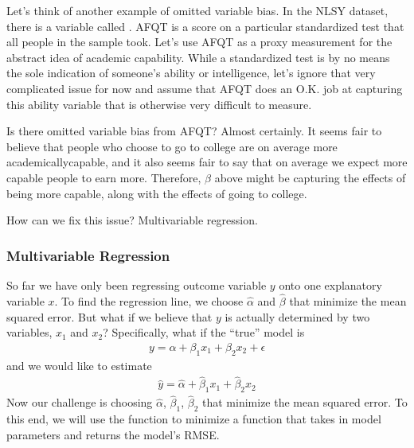 \documentclass[letterpaper,10pt,english]{jupyterBook}
\begin{document}
\sphinxAtStartPar
Let’s think of another example of omitted variable bias. In the NLSY dataset, there is a variable called . AFQT is a score on a particular standardized test that all people in the sample took. Let’s use AFQT as a proxy measurement for the abstract idea of academic capability. While a standardized test is by no means the sole indication of someone’s ability or intelligence, let’s ignore that very complicated issue for now and assume that AFQT does an O.K. job at capturing this ability variable that is otherwise very difficult to measure.

\sphinxAtStartPar
Is there omitted variable bias from AFQT? Almost certainly. It seems fair to believe that people who choose to go to college are on average more academically\sphinxhyphen{}capable, and it also seems fair to say that on average we expect more capable people to earn more. Therefore, \(\hat{\beta}\) above might be capturing the effects of being more capable, along with the effects of going to college.

\sphinxAtStartPar
How can we fix this issue? Multivariable regression.


\subsubsection{Multivariable Regression}
\label{\detokenize{content/11-econometrics/multivariable:multivariable-regression}}
\sphinxAtStartPar
So far we have only been regressing outcome variable \(y\) onto one explanatory variable \(x\). To find the regression line, we choose \(\hat{\alpha}\) and \(\hat{\beta}\) that minimize the mean squared error. But what if we believe that \(y\) is actually determined by two variables, \(x_1\) and \(x_2\)? Specifically, what if the “true” model is
\begin{equation*}
\begin{split}
y = \alpha + \beta_1 x_{1} + \beta_2 x_{2} + \epsilon
\end{split}
\end{equation*}
\sphinxAtStartPar
and we would like to estimate
\begin{equation*}
\begin{split}
\hat{y} = \hat{\alpha} + \hat{\beta}_1 x_{1} + \hat{\beta}_2 x_{2}
\end{split}
\end{equation*}
\sphinxAtStartPar
Now our challenge is choosing \(\hat{\alpha}\), \(\hat{\beta}_1\),  \(\hat{\beta}_2\) that minimize the mean squared error. To this end, we will use the  function to minimize a function  that takes in model parameters and returns the model’s RMSE.
\end{document}
